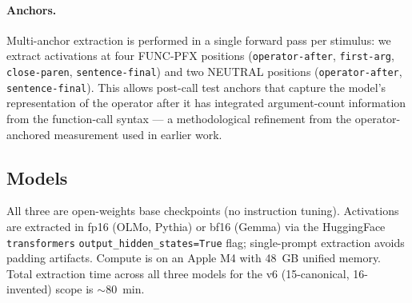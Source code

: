 \documentclass[11pt,letterpaper]{article}
\begin{document}
\paragraph{Anchors.} Multi-anchor extraction is performed in a single
forward pass per stimulus: we extract activations at four FUNC-PFX
positions (\texttt{operator-after}, \texttt{first-arg},
\texttt{close-paren}, \texttt{sentence-final}) and two NEUTRAL
positions (\texttt{operator-after}, \texttt{sentence-final}). This
allows post-call test anchors that capture the model's representation
of the operator after it has integrated argument-count information
from the function-call syntax --- a methodological refinement from
the operator-anchored measurement used in earlier work.

\subsection{Models}
\label{sec:models}

\begin{table}[h]
  \centering
  \small
  \caption{The three open base language model families used throughout.}
  \label{tab:models}
\end{table}

All three are open-weights base checkpoints (no instruction tuning).
Activations are extracted in fp16 (OLMo, Pythia) or bf16 (Gemma) via
the HuggingFace \texttt{transformers} \texttt{output\_hidden\_states=True}
flag; single-prompt extraction avoids padding artifacts. Compute is on
an Apple M4 with 48~GB unified memory. Total extraction time across
all three models for the v6 (15-canonical, 16-invented) scope is
${\sim}80$~min.
\end{document}
